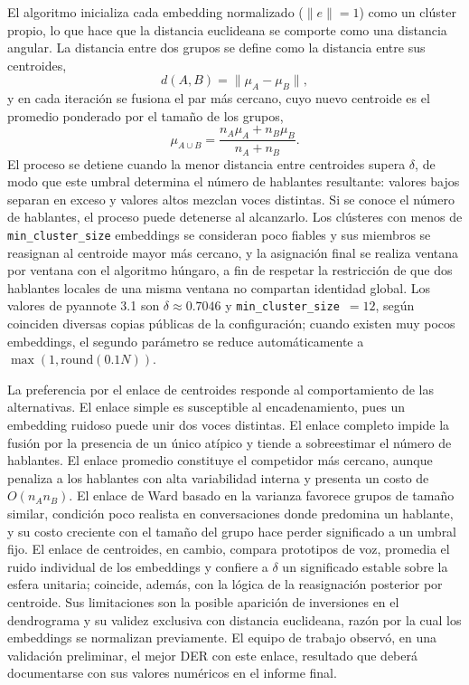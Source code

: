 \documentclass[11pt,a4paper]{article}
\begin{document}
El algoritmo inicializa cada embedding normalizado ($\lVert e\rVert=1$) como un clúster propio, lo que hace que la distancia euclideana se comporte como una distancia angular. La distancia entre dos grupos se define como la distancia entre sus centroides,
\begin{equation}
d(A,B)=\lVert\mu_A-\mu_B\rVert,
\end{equation}
y en cada iteración se fusiona el par más cercano, cuyo nuevo centroide es el promedio ponderado por el tamaño de los grupos,
\begin{equation}
\mu_{A\cup B}=\frac{n_A\mu_A+n_B\mu_B}{n_A+n_B}.
\end{equation}
El proceso se detiene cuando la menor distancia entre centroides supera $\delta$, de modo que este umbral determina el número de hablantes resultante: valores bajos separan en exceso y valores altos mezclan voces distintas. Si se conoce el número de hablantes, el proceso puede detenerse al alcanzarlo. Los clústeres con menos de \texttt{min\_cluster\_size} embeddings se consideran poco fiables y sus miembros se reasignan al centroide mayor más cercano, y la asignación final se realiza ventana por ventana con el algoritmo húngaro, a fin de respetar la restricción de que dos hablantes locales de una misma ventana no compartan identidad global. Los valores de pyannote 3.1 son $\delta\approx0.7046$ y \texttt{min\_cluster\_size}~$=12$, según coinciden diversas copias públicas de la configuración; cuando existen muy pocos embeddings, el segundo parámetro se reduce automáticamente a $\max(1,\mathrm{round}(0.1N))$.

La preferencia por el enlace de centroides responde al comportamiento de las alternativas. El enlace simple es susceptible al encadenamiento, pues un embedding ruidoso puede unir dos voces distintas. El enlace completo impide la fusión por la presencia de un único atípico y tiende a sobreestimar el número de hablantes. El enlace promedio constituye el competidor más cercano, aunque penaliza a los hablantes con alta variabilidad interna y presenta un costo de $O(n_A n_B)$. El enlace de Ward basado en la varianza favorece grupos de tamaño similar, condición poco realista en conversaciones donde predomina un hablante, y su costo creciente con el tamaño del grupo hace perder significado a un umbral fijo. El enlace de centroides, en cambio, compara prototipos de voz, promedia el ruido individual de los embeddings y confiere a $\delta$ un significado estable sobre la esfera unitaria; coincide, además, con la lógica de la reasignación posterior por centroide. Sus limitaciones son la posible aparición de inversiones en el dendrograma y su validez exclusiva con distancia euclideana, razón por la cual los embeddings se normalizan previamente. El equipo de trabajo observó, en una validación preliminar, el mejor DER con este enlace, resultado que deberá documentarse con sus valores numéricos en el informe final.
\end{document}
